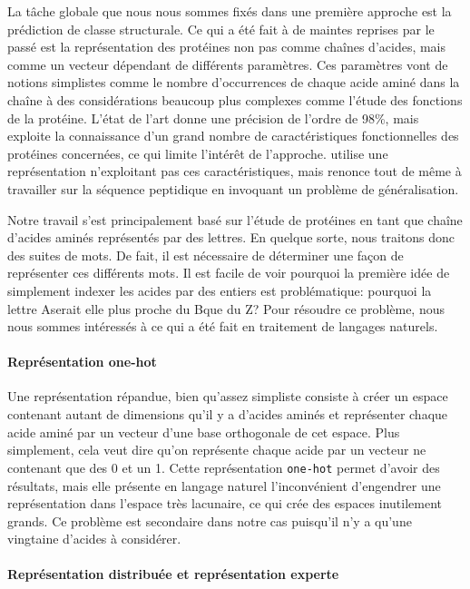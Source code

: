 \documentclass[a4paper, 11pt, onecolumn]{article}
\begin{document}
La tâche globale que nous nous sommes fixés dans une première approche est la
prédiction de classe structurale. Ce qui a été fait à de maintes reprises par le passé est la représentation des
protéines non pas comme chaînes d'acides, mais comme un vecteur dépendant de
différents paramètres. Ces paramètres vont de notions simplistes comme le nombre
d'occurrences de chaque acide aminé dans la chaîne à des considérations beaucoup
plus complexes comme l'étude des fonctions de la protéine. L'état de l'art donne
une précision de l'ordre de 98\%, mais exploite la connaissance d'un grand
nombre de caractéristiques fonctionnelles des protéines concernées, ce qui
limite l'intérêt de l'approche. \cite{jian2013predicting} utilise une
représentation n'exploitant pas ces caractéristiques, mais renonce tout de même
à travailler sur la séquence peptidique en invoquant un problème de généralisation.

Notre travail s'est principalement basé sur l'étude de protéines en tant que
chaîne d'acides aminés représentés par des lettres. En quelque sorte, nous traitons donc des suites de \og
mots\fg. De fait, il est nécessaire de déterminer une façon de représenter ces
différents mots. Il est facile de voir pourquoi la première idée de simplement
indexer les acides par des entiers est problématique: pourquoi la lettre \og
A\fg serait elle plus proche du \og B\fg que du \og Z\fg? Pour résoudre ce
problème, nous nous sommes intéressés à ce qui a été fait en traitement de langages
naturels.

\paragraph{Représentation one-hot}

Une représentation répandue, bien qu'assez simpliste consiste à créer un espace
contenant autant de dimensions qu'il y a d'acides aminés et représenter chaque
acide aminé par un vecteur d'une base orthogonale de cet espace. Plus
simplement, cela veut dire qu'on représente chaque acide par un vecteur ne
contenant que des 0 et un 1. Cette représentation \texttt{one-hot} permet d'avoir des résultats,
mais elle présente en langage naturel l'inconvénient d'engendrer une
représentation dans l'espace très lacunaire, ce qui crée des espaces inutilement
grands. Ce problème est secondaire dans notre cas puisqu'il n'y a qu'une
vingtaine d'acides à considérer.

\paragraph{Représentation distribuée et représentation experte}
\end{document}
